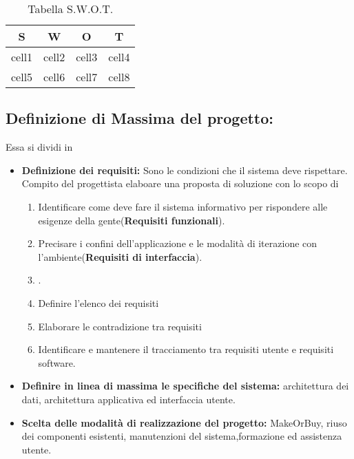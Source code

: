 \documentclass{report}
\begin{document}
\begin{table}[h!]
\begin{center}
\begin{tabular}{ |c|c|c|c| } 
 \hline
 S & W & O & T \\ [0.5ex] 
 \hline\hline
 cell1 & cell2 & cell3 & cell4 \\
 cell5 & cell6 & cell7 & cell8 \\
 \hline
\end{tabular}
\end{center}
\caption{Tabella S.W.O.T.}
\label{swot}
\end{table}




\subsection{Definizione di Massima del progetto:}
Essa si dividi in
\begin{itemize}
    \item \textbf{Definizione dei requisiti:} Sono le condizioni che il sistema deve rispettare. 		Compito del progettista elaboare una proposta di soluzione con lo scopo di
    \begin{enumerate}
        \item Identificare come deve fare il sistema informativo per rispondere alle esigenze della gente(\textbf{Requisiti funzionali}).
        \item Precisare i confini dell'applicazione e le modalità di iterazione con l'ambiente(\textbf{Requisiti di interfaccia}).
        \item .
        \item Definire l'elenco dei requisiti
        \item Elaborare le contradizione tra requisiti
        \item Identificare e mantenere il tracciamento tra requisiti utente e requisiti software.
    \end{enumerate}
    \item \textbf{Definire in linea di massima le specifiche del sistema:} architettura dei dati, architettura applicativa ed interfaccia utente.
    \item \textbf{Scelta delle modalità di realizzazione del progetto:} MakeOrBuy, riuso dei componenti esistenti, manutenzioni del sistema,formazione ed assistenza utente.
\end{itemize}
\end{document}
